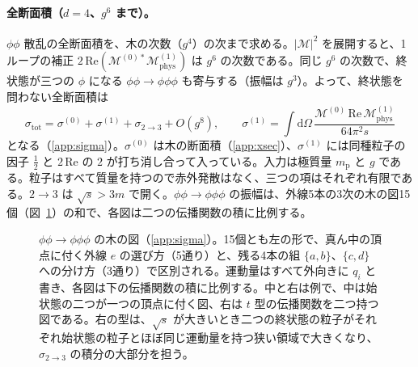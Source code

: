 \documentclass[a4paper,10pt]{ltjsarticle}
\newcommand{\dd}{\mathrm{d}}
\begin{document}
\paragraph{全断面積（$d=4$、$g^6$ まで）。}$\phi\phi$ 散乱の全断面積を、木の次数（$g^4$）の次まで求める。$|\mathcal{M}|^2$ を展開すると、1ループの補正 $2\,\mathrm{Re}(\mathcal{M}^{(0)*}\mathcal{M}^{(1)}_{\mathrm{phys}})$ は $g^6$ の次数である。同じ $g^6$ の次数で、終状態が三つの $\phi$ になる $\phi\phi\to\phi\phi\phi$ も寄与する（振幅は $g^3$）。よって、終状態を問わない全断面積は
\begin{equation}
\sigma_{\mathrm{tot}}=\sigma^{(0)}+\sigma^{(1)}+\sigma_{2\to3}+O(g^8),\qquad
\sigma^{(1)}=\int\!\dd\Omega\,\frac{\mathcal{M}^{(0)}\,\mathrm{Re}\,\mathcal{M}^{(1)}_{\mathrm{phys}}}{64\pi^2s}
\label{eq:sigmatot}
\end{equation}
となる（\ref{app:sigma}）。$\sigma^{(0)}$ は木の断面積（\ref{app:xsec}）、$\sigma^{(1)}$ には同種粒子の因子 $\frac12$ と $2\,\mathrm{Re}$ の $2$ が打ち消し合って入っている。入力は極質量 $m_{\mathrm p}$ と $g$ である。粒子はすべて質量を持つので赤外発散はなく、三つの項はそれぞれ有限である。$2\to3$ は $\sqrt s>3m$ で開く。$\phi\phi\to\phi\phi\phi$ の振幅は、外線5本の3次の木の図15個（図~\ref{fig:twothree}）の和で、各図は二つの伝播関数の積に比例する。

\begin{figure}[tbp]
\centering
{}
\caption{$\phi\phi\to\phi\phi\phi$ の木の図（\ref{app:sigma}）。15個とも左の形で、真ん中の頂点に付く外線 $e$ の選び方（5通り）と、残る4本の組 $\{a,b\}$、$\{c,d\}$ への分け方（3通り）で区別される。運動量はすべて外向きに $q_i$ と書き、各図は下の伝播関数の積に比例する。中と右は例で、中は始状態の二つが一つの頂点に付く図、右は $t$ 型の伝播関数を二つ持つ図である。右の型は、$\sqrt s$ が大きいとき二つの終状態の粒子がそれぞれ始状態の粒子とほぼ同じ運動量を持つ狭い領域で大きくなり、$\sigma_{2\to3}$ の積分の大部分を担う。}
\label{fig:twothree}
\end{figure}
\end{document}
